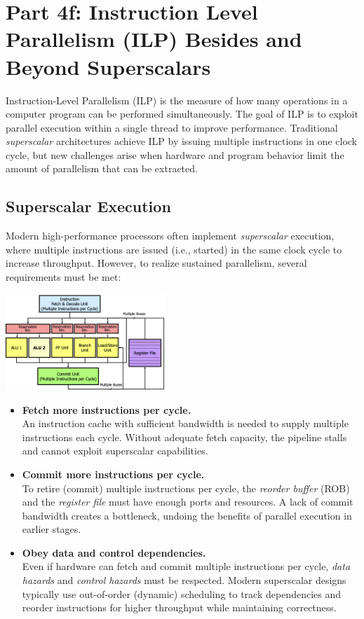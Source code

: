 \chapter{Part 4f: Instruction Level Parallelism (ILP) Besides and Beyond Superscalars}

Instruction-Level Parallelism (ILP) is the measure of how many operations in a computer program can be performed simultaneously. The goal of ILP is to exploit parallel execution within a single thread to improve performance. Traditional \emph{superscalar} architectures achieve ILP by issuing multiple instructions in one clock cycle, but new challenges arise when hardware and program behavior limit the amount of parallelism that can be extracted.

\section{Superscalar Execution}
Modern high-performance processors often implement \emph{superscalar} execution, where multiple instructions are issued (i.e., started) in the same clock cycle to increase throughput. However, to realize sustained parallelism, several requirements must be met:

\begin{center}
    \includegraphics[width=0.45\textwidth]{chapters/chapter4f/images/superscalar.png}
\end{center}

\begin{itemize}
  \item \textbf{Fetch more instructions per cycle.}\\
  An instruction cache with sufficient bandwidth is needed to supply multiple instructions each cycle. Without adequate fetch capacity, the pipeline stalls and cannot exploit superscalar capabilities.

  \item \textbf{Commit more instructions per cycle.}\\
  To retire (commit) multiple instructions per cycle, the \emph{reorder buffer} (ROB) and the \emph{register file} must have enough ports and resources. A lack of commit bandwidth creates a bottleneck, undoing the benefits of parallel execution in earlier stages.

  \item \textbf{Obey data and control dependencies.}\\
  Even if hardware can fetch and commit multiple instructions per cycle, \emph{data hazards} and \emph{control hazards} must be respected. Modern superscalar designs typically use out-of-order (dynamic) scheduling to track dependencies and reorder instructions for higher throughput while maintaining correctness.
\end{itemize}

